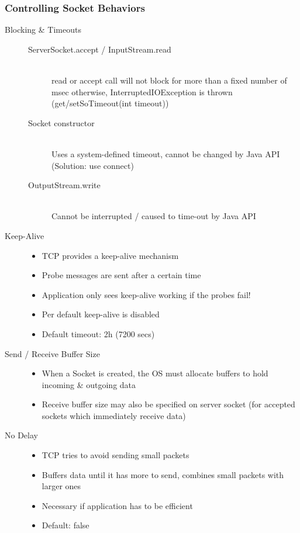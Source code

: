 \documentclass[10pt]{article}
\begin{document}
\subsubsection{Controlling Socket Behaviors}
\begin{description}
	\item[Blocking \& Timeouts] \hfill 
	\begin{description}
		\item[ServerSocket.accept / InputStream.read] \hfill \\
			read or accept call will not block for more than a fixed number of msec otherwise, InterruptedIOException is thrown (get/setSoTimeout(int timeout))
		\item[Socket constructor] \hfill \\
			Uses a system-defined timeout, cannot be changed by Java API (Solution: use connect)
		\item[OutputStream.write] \hfill \\
			Cannot be interrupted / caused to time-out by Java API
	\end{description}
	\item[Keep-Alive] \hfill
	\begin{itemize}
		\item TCP provides a keep-alive mechanism
		\item Probe messages are sent after a certain time
		\item Application only sees keep-alive working if the probes fail!
		\item Per default keep-alive is disabled
		\item Default timeout: 2h (7200 secs)
	\end{itemize}
	\item[Send / Receive Buffer Size] \hfill
	\begin{itemize}
		\item When a Socket is created, the OS must allocate buffers to hold incoming \& outgoing data
		\item Receive buffer size may also be specified on server socket (for accepted
sockets which immediately receive data)
	\end{itemize}
	\item[No Delay] \hfill
	\begin{itemize}
		\item TCP tries to avoid sending small packets
		\item Buffers data until it has more to send, combines small packets with larger ones
		\item Necessary if application has to be efficient
		\item Default: false
	\end{itemize}
\end{description}
\end{document}
